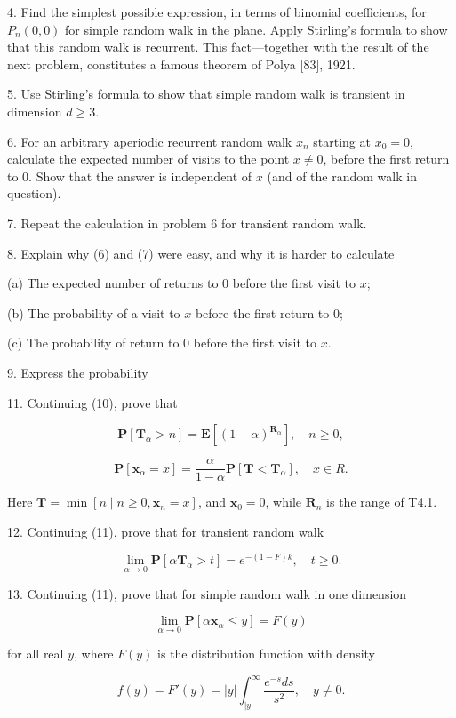 {4. Find the simplest possible expression, in terms of binomial coefficients, for $P_n(0,0)$ for simple random walk in the plane. Apply Stirling's formula to show that this random walk is recurrent. This fact—together with the result of the next problem, constitutes a famous theorem of Polya [83], 1921.

5. Use Stirling's formula to show that simple random walk is transient in dimension $d \geq 3$.

6. For an arbitrary aperiodic recurrent random walk $x_n$ starting at $x_0 = 0$, calculate the expected number of visits to the point $x \neq 0$, before the first return to 0. Show that the answer is independent of $x$ (and of the random walk in question).

7. Repeat the calculation in problem 6 for transient random walk.

8. Explain why (6) and (7) were easy, and why it is harder to calculate

(a) The expected number of returns to 0 before the first visit to $x$;

(b) The probability of a visit to $x$ before the first return to 0;

(c) The probability of return to 0 before the first visit to $x$.

9. Express the probability

11. Continuing (10), prove that

$$\mathbf{P}[\mathbf{T}_{\alpha} > n] = \mathbf{E}[(1 - \alpha)^{\mathbf{R}_{\alpha}}], \quad n \geq 0,$$

$$\mathbf{P}[\mathbf{x}_{\alpha} = x] = \frac{\alpha}{1 - \alpha} \mathbf{P}[\mathbf{T} < \mathbf{T}_{\alpha}], \quad x \in R.$$

Here $\mathbf{T} = \min[n \mid n \geq 0, \mathbf{x}_n = x]$, and $\mathbf{x}_0 = 0$, while $\mathbf{R}_n$ is the range of T4.1.

12. Continuing (11), prove that for transient random walk

$$\lim_{\alpha \to 0} \mathbf{P}[\alpha \mathbf{T}_{\alpha} > t] = e^{-(1-F)k}, \quad t \geq 0.$$

13. Continuing (11), prove that for simple random walk in one dimension

$$\lim_{\alpha \to 0} \mathbf{P}[\alpha \mathbf{x}_{\alpha} \leq y] = F(y)$$

for all real $y$, where $F(y)$ is the distribution function with density

$$f(y) = F'(y) = |y| \int_{|y|}^{\infty} \frac{e^{-s} ds}{s^2}, \quad y \neq 0.$$

}
